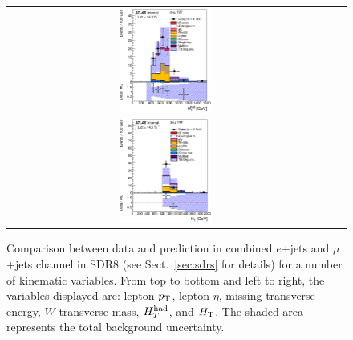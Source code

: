 \begin{figure}[h!]
\begin{center}
\begin{tabular}{ccc}
\includegraphics[width=0.30\textwidth]{appendices/figures/sdrs/HTHad_ELEMUONCR8_1W_NOMINAL.eps}  \\
\includegraphics[width=0.30\textwidth]{appendices/figures/sdrs/HTAll_ELEMUONCR8_1W_NOMINAL.eps}  &  &\\
\end{tabular}\caption{\small {Comparison between data and prediction in combined $e$+jets and $\mu$+jets channel in SDR8 (see Sect.~\ref{sec:sdrs} for details) 
for a number of kinematic variables. From top to bottom and left to right, the variables displayed are: lepton $\pt$, lepton $\eta$, missing transverse energy, $W$ transverse mass,
$\hthad$, and $\HT$. The shaded area represents the total background uncertainty.}}
\label{fig:ELEMUONCR8_1}
\end{center}
\end{figure}                                                                             

